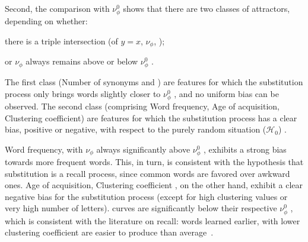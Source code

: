 Second, the comparison with $\nu_{\phi}^0$  shows that there are two classes of attractors, depending on whether:
\begin{APAenumerate}
\item there is a triple intersection (of $y=x$, $\nu_{\phi}$, );
\item or $\nu_{\phi}$ always remains above or below $\nu_{\phi}^0$ .
\end{APAenumerate}
The first class (Number of synonyms and ) are features for which the substitution process only brings words slightly closer to $\nu_{\phi}^0$ , and no uniform bias can be observed.
The second class (comprising Word frequency, Age of acquisition, Clustering coefficient) are features for which the substitution process has a clear bias, positive or negative, with respect to  the purely random situation ($\mathcal{H}_0$) .

Word frequency, with $\nu_{\phi}$ always significantly above $\nu_{\phi}^0$ , exhibits a strong bias towards more frequent words.
This, in turn, is consistent with the hypothesis that substitution is a recall process, since common words are favored over awkward ones.
Age of acquisition, Clustering coefficient , on the other hand, exhibit a clear negative bias for the substitution process (except for high clustering values or very high number of letters).
 curves are significantly below their respective $\nu_{\phi}^0$ , which is consistent with the literature on recall:
words learned earlier, with lower clustering coefficient  are easier to produce than average~\citep{nelson_how_2013,zevin_age_2002,baddeley_word_1975}.

